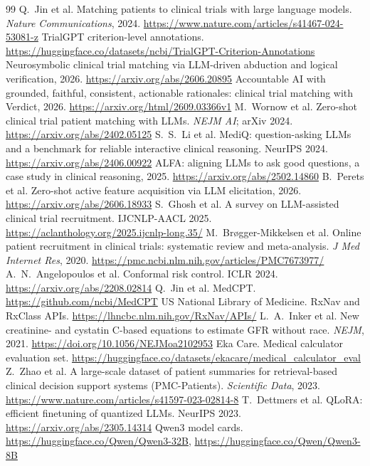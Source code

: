 \documentclass[10pt,a4paper]{article}
\begin{document}
\vspace{-5pt}
{\footnotesize\raggedright
\begin{thebibliography}{99}\setlength{\itemsep}{0.3pt}
 Q.~Jin et al. Matching patients to clinical trials with large language models. \emph{Nature Communications}, 2024. \url{https://www.nature.com/articles/s41467-024-53081-z}
 TrialGPT criterion-level annotations. \url{https://huggingface.co/datasets/ncbi/TrialGPT-Criterion-Annotations}
 Neurosymbolic clinical trial matching via LLM-driven abduction and logical verification, 2026. \url{https://arxiv.org/abs/2606.20895}
 Accountable AI with grounded, faithful, consistent, actionable rationales: clinical trial matching with Verdict, 2026. \url{https://arxiv.org/html/2609.03366v1}
 M.~Wornow et al. Zero-shot clinical trial patient matching with LLMs. \emph{NEJM AI}; arXiv 2024. \url{https://arxiv.org/abs/2402.05125}
 S.~S.~Li et al. MediQ: question-asking LLMs and a benchmark for reliable interactive clinical reasoning. NeurIPS 2024. \url{https://arxiv.org/abs/2406.00922}
 ALFA: aligning LLMs to ask good questions, a case study in clinical reasoning, 2025. \url{https://arxiv.org/abs/2502.14860}
 B.~Perets et al. Zero-shot active feature acquisition via LLM elicitation, 2026. \url{https://arxiv.org/abs/2606.18933}
 S.~Ghosh et al. A survey on LLM-assisted clinical trial recruitment. IJCNLP-AACL 2025. \url{https://aclanthology.org/2025.ijcnlp-long.35/}
 M.~Br{\o}gger-Mikkelsen et al. Online patient recruitment in clinical trials: systematic review and meta-analysis. \emph{J Med Internet Res}, 2020. \url{https://pmc.ncbi.nlm.nih.gov/articles/PMC7673977/}
 A.~N.~Angelopoulos et al. Conformal risk control. ICLR 2024. \url{https://arxiv.org/abs/2208.02814}
 Q.~Jin et al. MedCPT. \url{https://github.com/ncbi/MedCPT}
 US National Library of Medicine. RxNav and RxClass APIs. \url{https://lhncbc.nlm.nih.gov/RxNav/APIs/}
 L.~A.~Inker et al. New creatinine- and cystatin C-based equations to estimate GFR without race. \emph{NEJM}, 2021. \url{https://doi.org/10.1056/NEJMoa2102953}
 Eka Care. Medical calculator evaluation set. \url{https://huggingface.co/datasets/ekacare/medical_calculator_eval}
 Z.~Zhao et al. A large-scale dataset of patient summaries for retrieval-based clinical decision support systems (PMC-Patients). \emph{Scientific Data}, 2023. \url{https://www.nature.com/articles/s41597-023-02814-8}
 T.~Dettmers et al. QLoRA: efficient finetuning of quantized LLMs. NeurIPS 2023. \url{https://arxiv.org/abs/2305.14314}
 Qwen3 model cards. \url{https://huggingface.co/Qwen/Qwen3-32B}, \url{https://huggingface.co/Qwen/Qwen3-8B}
\end{thebibliography}}
\end{document}
